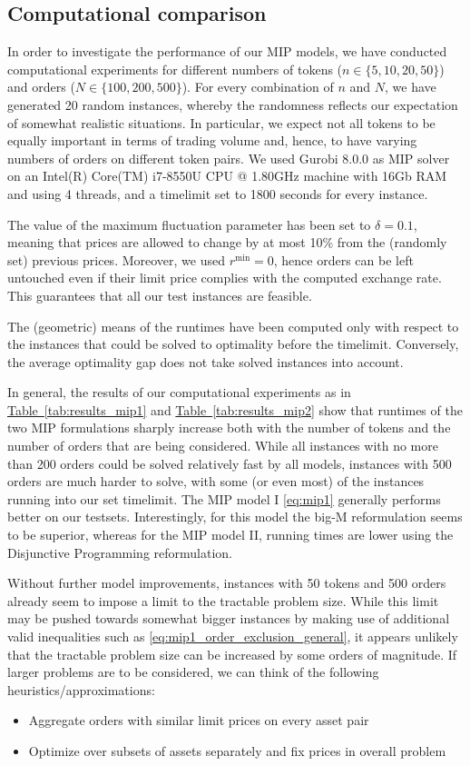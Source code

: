 \documentclass[11pt,parskip=full]{scrartcl}%
\newcommand*{\wrt}{with respect to }
\newcommand*{\Min}{\mathrm{min}}
\newcommand*{\tabref}[1]{\hyperref[{#1}]{Table~\ref*{#1}}}
\begin{document}
\newpage
\subsection{Computational comparison}
\label{subsec:computational_comparison}

In order to investigate the performance of our MIP models, we have conducted computational
experiments for different numbers of tokens ($ n \in \{5,10,20,50\} $) and orders ($ N \in 
\{100,200,500\} $).
For every combination of $ n $ and $ N $, we have generated 20 random instances, whereby the
randomness reflects our expectation of somewhat realistic situations.
In particular, we expect not all tokens to be equally important in terms of trading volume and,
hence, to have varying numbers of orders on different token pairs.
We used Gurobi 8.0.0 as MIP solver on an Intel(R) Core(TM) i7-8550U CPU @ 1.80GHz machine with 16Gb
RAM and using 4 threads, and a timelimit set to 1800 seconds for every instance.

The value of the maximum fluctuation parameter has been set to $ \delta = 0.1 $, meaning that
prices are allowed to change by at most 10\% from the (randomly set) previous prices.
Moreover, we used $ r^\Min = 0 $, hence orders can be left untouched even if their limit price
complies with the computed exchange rate.
This guarantees that all our test instances are feasible.

The (geometric) means of the runtimes have been computed only \wrt the instances that could be
solved to optimality before the timelimit. Conversely, the average optimality gap does not take
solved instances into account.

In general, the results of our computational experiments as in \tabref{tab:results_mip1} and 
\tabref{tab:results_mip2} show that runtimes of the two MIP formulations sharply increase both with
the number of tokens and the number of orders that are being considered.
While all instances with no more than 200 orders could be solved relatively fast by all models,
instances with 500 orders are much harder to solve, with some (or even most) of the instances
running into our set timelimit.
The MIP model I \eqref{eq:mip1} generally performs better on our testsets.
Interestingly, for this model the big-M reformulation seems to be superior, whereas for the MIP
model II, running times are lower using the Disjunctive Programming reformulation.

Without further model improvements, instances with 50 tokens and 500 orders already seem to impose
a limit to the tractable problem size.
While this limit may be pushed towards somewhat bigger instances by making use of additional valid
inequalities such as \eqref{eq:mip1_order_exclusion_general}, it appears unlikely that the
tractable problem size can be increased by some orders of magnitude.
If larger problems are to be considered, we can think of the following heuristics/approximations:
\begin{itemize}
    \item Aggregate orders with similar limit prices on every asset pair
    \item Optimize over subsets of assets separately and fix prices in overall problem
\end{itemize}
\end{document}
